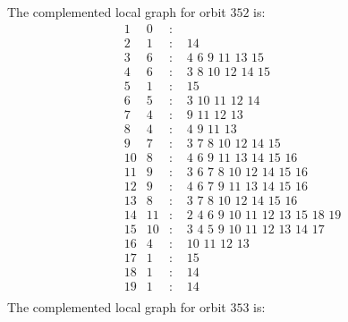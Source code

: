 \documentclass[12pt]{article}
\begin{document}
The complemented local graph for orbit $352$ is:
\begin{equation*}
\begin{array}{rrcl}
1&0&:&\\
2&1&:&\,\,14\\
3&6&:&\,\,4\,\,6\,\,9\,\,11\,\,13\,\,15\\
4&6&:&\,\,3\,\,8\,\,10\,\,12\,\,14\,\,15\\
5&1&:&\,\,15\\
6&5&:&\,\,3\,\,10\,\,11\,\,12\,\,14\\
7&4&:&\,\,9\,\,11\,\,12\,\,13\\
8&4&:&\,\,4\,\,9\,\,11\,\,13\\
9&7&:&\,\,3\,\,7\,\,8\,\,10\,\,12\,\,14\,\,15\\
10&8&:&\,\,4\,\,6\,\,9\,\,11\,\,13\,\,14\,\,15\,\,16\\
11&9&:&\,\,3\,\,6\,\,7\,\,8\,\,10\,\,12\,\,14\,\,15\,\,16\\
12&9&:&\,\,4\,\,6\,\,7\,\,9\,\,11\,\,13\,\,14\,\,15\,\,16\\
13&8&:&\,\,3\,\,7\,\,8\,\,10\,\,12\,\,14\,\,15\,\,16\\
14&11&:&\,\,2\,\,4\,\,6\,\,9\,\,10\,\,11\,\,12\,\,13\,\,15\,\,18\,\,19\\
15&10&:&\,\,3\,\,4\,\,5\,\,9\,\,10\,\,11\,\,12\,\,13\,\,14\,\,17\\
16&4&:&\,\,10\,\,11\,\,12\,\,13\\
17&1&:&\,\,15\\
18&1&:&\,\,14\\
19&1&:&\,\,14\\
\end{array}
\end{equation*}
The complemented local graph for orbit $353$ is:
\end{document}
